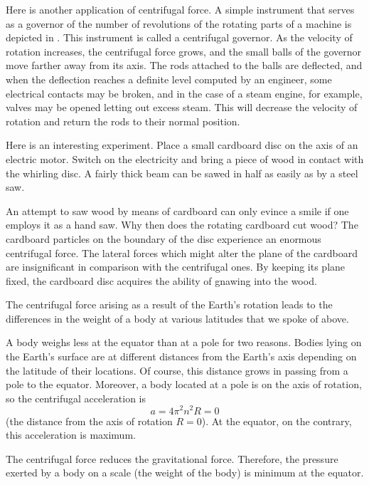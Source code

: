 Here is another application of centrifugal force. A
simple instrument that serves as a governor of the number
of revolutions of the rotating parts of a machine is depicted in . This instrument is called a centrifugal governor. As the velocity of rotation increases, the centrifugal force grows, and the small balls of the governor move farther away from its axis. The rods attached to the balls are deflected, and when the deflection
reaches a definite level computed by an engineer, some electrical contacts may be broken, and in the case of a steam engine, for example, valves may be opened letting out excess steam. This will decrease the velocity of rotation and return the rods to their normal position.

Here is an interesting experiment. Place a small cardboard disc on the axis of an electric motor. Switch on the electricity and bring a piece of wood in contact with the whirling disc. A fairly thick beam can be sawed in half as easily as by a steel saw.

An attempt to saw wood by means of cardboard can
only evince a smile if one employs it as a hand saw.
Why then does the rotating cardboard cut wood? The
cardboard particles on the boundary of the disc experience
an enormous centrifugal force. The lateral forces which might alter the plane of the cardboard are insignificant in comparison with the centrifugal ones. By keeping its plane fixed, the cardboard disc acquires the ability of gnawing
into the wood.

The centrifugal force arising as a result of the Earth's
rotation leads to the differences in the weight of a body
at various latitudes that we spoke of above.

A body weighs less at the equator than at a pole for
two reasons. Bodies lying on the Earth's surface are at
different distances from the Earth's axis depending on
the latitude of their locations. Of course, this distance
grows in passing from a pole to the equator. Moreover, a
body located at a pole is on the axis of rotation, so the
centrifugal acceleration is 
\begin{equation*}%
a = 4 \pi^{2}n^{2}R = 0
\end{equation*}
(the distance from the axis of rotation $R = 0$). At the equator, on the contrary, this acceleration is maximum.

The centrifugal force reduces the gravitational force. Therefore, the pressure exerted by a body on a scale (the weight of the body) is minimum at the equator.

